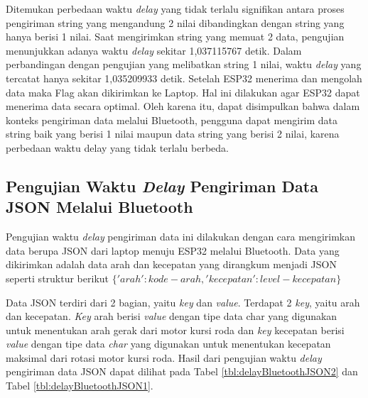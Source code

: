 Ditemukan perbedaan waktu \emph{delay} yang tidak terlalu signifikan antara proses pengiriman string yang mengandung 2 nilai dibandingkan dengan string yang hanya berisi 1 nilai. Saat mengirimkan string yang memuat 2 data, pengujian menunjukkan adanya waktu \emph{delay} sekitar 1,037115767 detik. Dalam perbandingan dengan pengujian yang melibatkan string 1 nilai, waktu \emph{delay} yang tercatat hanya sekitar 1,035209933 detik. Setelah ESP32 menerima dan mengolah data maka Flag akan dikirimkan ke Laptop. Hal ini dilakukan agar ESP32 dapat menerima data secara optimal. Oleh karena itu, dapat disimpulkan bahwa dalam konteks pengiriman data melalui Bluetooth, pengguna dapat mengirim data string baik yang berisi 1 nilai maupun data string yang berisi 2 nilai, karena perbedaan waktu delay yang tidak terlalu berbeda.

\subsection{Pengujian Waktu \emph{Delay} Pengiriman Data JSON Melalui Bluetooth}
\label{sec:delayBluetoothJSON}

Pengujian waktu \emph{delay} pengiriman data ini dilakukan dengan cara mengirimkan data berupa JSON dari laptop menuju ESP32 melalui Bluetooth. Data yang dikirimkan adalah data arah dan kecepatan yang dirangkum menjadi JSON seperti struktur berikut \(\{'arah': kode-arah, 'kecepatan': level-kecepatan\}\) 

Data JSON terdiri dari 2 bagian, yaitu \emph{key} dan \emph{value}. Terdapat 2 \emph{key}, yaitu arah dan kecepatan. \emph{Key} arah berisi \emph{value} dengan tipe data char yang digunakan untuk menentukan arah gerak dari motor kursi roda dan \emph{key} kecepatan berisi \emph{value} dengan tipe data \emph{char} yang digunakan untuk menentukan kecepatan maksimal dari rotasi motor kursi roda. Hasil dari pengujian waktu \emph{delay} pengiriman data JSON dapat dilihat pada Tabel \ref{tbl:delayBluetoothJSON2} dan Tabel \ref{tbl:delayBluetoothJSON1}.

